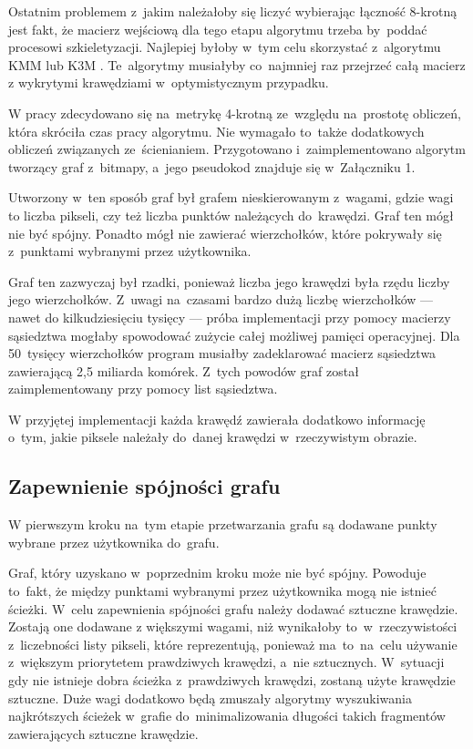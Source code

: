 \documentclass[a4paper,11pt,twoside,openright]{report}
\theoremstyle{definition}
\begin{document}
Ostatnim problemem z~jakim należałoby się liczyć wybierając łączność 8-krotną
jest fakt, że macierz wejściową dla tego etapu algorytmu trzeba by~poddać procesowi
szkieletyzacji. Najlepiej byłoby w~tym celu skorzystać z~algorytmu KMM \cite{KMM}
lub K3M \cite{K3M}. Te~algorytmy musiałyby co~najmniej raz przejrzeć całą macierz
z wykrytymi krawędziami w~optymistycznym przypadku.

\bigskip

W pracy zdecydowano się na~metrykę 4-krotną ze~względu na~prostotę obliczeń,
która skróciła czas pracy algorytmu. Nie wymagało to~także dodatkowych
obliczeń związanych ze~ścienianiem. Przygotowano
i~zaimplementowano algorytm tworzący graf z~bitmapy, a~jego pseudokod znajduje
się w~Załączniku 1. %

Utworzony w~ten sposób graf był grafem nieskierowanym z~wagami, gdzie wagi to
liczba pikseli, czy też liczba punktów należących do~krawędzi. Graf ten mógł nie być
spójny. Ponadto mógł nie zawierać wierzchołków, które pokrywały się z~punktami
wybranymi przez użytkownika.

Graf ten zazwyczaj był rzadki, ponieważ liczba jego krawędzi była rzędu liczby
jego wierzchołków.  Z~uwagi na~czasami bardzo dużą liczbę wierzchołków --- nawet
do kilkudziesięciu tysięcy --- próba implementacji przy pomocy macierzy sąsiedztwa
mogłaby spowodować zużycie całej możliwej pamięci operacyjnej. Dla 50~tysięcy
wierzchołków program musiałby zadeklarować macierz sąsiedztwa zawierającą 2,5
miliarda komórek. Z~tych powodów graf został zaimplementowany przy pomocy list sąsiedztwa.

W przyjętej implementacji każda krawędź zawierała dodatkowo informację o~tym, jakie
piksele należały do~danej krawędzi w~rzeczywistym obrazie.

\subsection {Zapewnienie spójności grafu}

W pierwszym kroku na~tym etapie przetwarzania grafu są dodawane punkty wybrane
przez użytkownika do~grafu.

Graf, który uzyskano w~poprzednim kroku może nie być spójny. Powoduje to~fakt,
że między punktami wybranymi przez użytkownika mogą nie istnieć ścieżki. W~celu
zapewnienia spójności grafu należy dodawać sztuczne krawędzie. Zostają one dodawane
z większymi wagami, niż wynikałoby to~w~rzeczywistości z~liczebności listy pikseli,
które reprezentują, ponieważ ma~to~na~celu używanie z~większym priorytetem prawdziwych
krawędzi, a~nie sztucznych. W~sytuacji gdy nie istnieje dobra ścieżka z~prawdziwych
krawędzi, zostaną użyte krawędzie sztuczne. Duże wagi dodatkowo będą zmuszały
algorytmy wyszukiwania najkrótszych ścieżek w~grafie do~minimalizowania długości
takich fragmentów zawierających sztuczne krawędzie.
\end{document}
